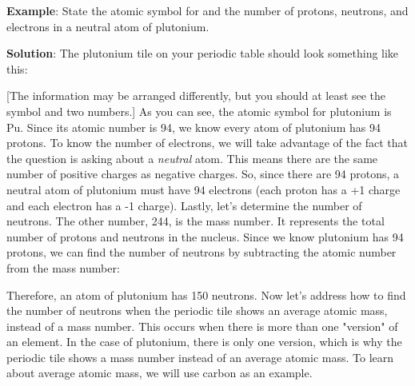 \textbf{Example}: State the atomic symbol for and the number of protons,
neutrons, and electrons in a neutral atom of plutonium.

\textbf{Solution}: The plutonium tile on your periodic table should look
something like this:
\begin{center}
\end{center}

[The information may be arranged differently, but you should at least see the
symbol and two numbers.] As you can see, the atomic symbol for plutonium is Pu.
Since its atomic number is 94, we know every atom of plutonium has 94 protons.
To know the number of electrons, we will take advantage of the fact that the
question is asking about a \textit{neutral} atom. This means there are the same
number of positive charges as negative charges. So, since there are 94 protons,
a neutral atom of plutonium must have 94 electrons (each proton has a +1 charge
and each electron has a -1 charge). Lastly, let's determine the number of
neutrons. The other number, 244, is the mass number. It represents the total
number of protons and neutrons in the nucleus. Since we know plutonium has 94
protons, we can find the number of neutrons by subtracting the atomic number
from the mass number:

\begin{center}
\end{center}

Therefore, an atom of plutonium has 150 neutrons. Now let's address how to find
the number of neutrons when the periodic tile shows an average atomic mass,
instead of a mass number. This occurs when there is more than one "version" of
an element. In the case of plutonium, there is only one version, which is why
the periodic tile shows a mass number instead of an average atomic mass. To
learn about average atomic mass, we will use carbon as an example.


